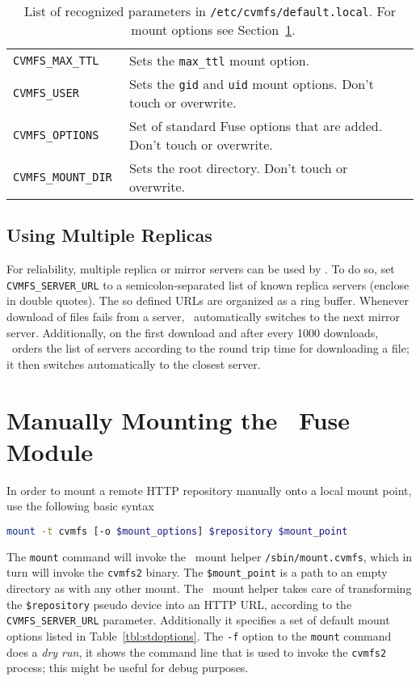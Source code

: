 \begin{table}
\begin{center}
\begin{tabularx}{\linewidth}{l|X}
			\tt CVMFS\_MAX\_TTL & Sets the \texttt{max\_ttl} mount option.\\
			\tt CVMFS\_USER & Sets the \texttt{gid} and \texttt{uid} mount options. Don't touch or overwrite.\\
			\tt CVMFS\_OPTIONS & Set of standard Fuse options that are added. Don't touch or overwrite. \\
			\tt CVMFS\_MOUNT\_DIR & Sets the \cvmfs root directory. Don't touch or overwrite. \\
		\end{tabularx}
	\end{center}
	\caption{List of recognized parameters in \texttt{/etc/cvmfs/default.local}. For \cvmfs\ mount options see Section~\ref{sct:mount}.}
	\label{tbl:parameters}
\end{table}

\subsection{Using Multiple Replicas}
For reliability, multiple replica or mirror servers can be used by \cvmfs.
To do so, set \texttt{CVMFS\_SERVER\_URL} to a semicolon-separated list of known replica servers (enclose in double quotes). 
The so defined URLs are organized as a ring buffer.
Whenever download of files fails from a server, \cvmfs\ automatically switches to the next mirror server.
Additionally, on the first download and after every 1000 downloads, \cvmfs\ orders the list of servers according to the round trip time for downloading a file; it then switches automatically to the closest server.

\section{Manually Mounting the \cvmfs\ Fuse Module}
\label{sct:mount}
In order to mount a remote HTTP repository manually onto a local mount point, use the following basic syntax
\begin{lstlisting}[language=bash]
mount -t cvmfs [-o $mount_options] $repository $mount_point
\end{lstlisting}
The \texttt{mount} command will invoke the \cvmfs\ mount helper \texttt{/sbin/mount.cvmfs}, which in turn will invoke the \texttt{cvmfs2} binary.
The \texttt{\$mount\_point} is a path to an empty directory as with any other mount.
The \cvmfs\ mount helper takes care of transforming the \texttt{\$repository} pseudo device into an HTTP URL, according to the \texttt{CVMFS\_SERVER\_URL} parameter.
Additionally it specifies a set of default mount options listed in Table~\ref{tbl:stdoptions}.
The \texttt{-f} option to the \texttt{mount} command does a \emph{dry run}, \ie it shows the command line that is used to invoke the \texttt{cvmfs2} process; this might be useful for debug purposes.

